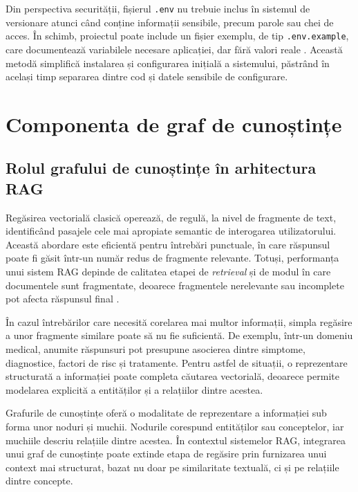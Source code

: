 \documentclass[12pt, a4paper, oneside, romanian]{teza-upb}
\begin{document}
Din perspectiva securității, fișierul \texttt{.env} nu trebuie inclus în sistemul de versionare atunci când conține informații sensibile, precum parole sau chei de acces. În schimb, proiectul poate include un fișier exemplu, de tip \texttt{.env.example}, care documentează variabilele necesare aplicației, dar fără valori reale \cite{python_dotenv_doc}. Această metodă simplifică instalarea și configurarea inițială a sistemului, păstrând în același timp separarea dintre cod și datele sensibile de configurare.

\section{Componenta de graf de cunoștințe}

\subsection{Rolul grafului de cunoștințe în arhitectura RAG}

Regăsirea vectorială clasică operează, de regulă, la nivel de fragmente de text, identificând pasajele cele mai apropiate semantic de interogarea utilizatorului. Această abordare este eficientă pentru întrebări punctuale, în care răspunsul poate fi găsit într-un număr redus de fragmente relevante. Totuși, performanța unui sistem RAG depinde de calitatea etapei de \textit{retrieval} și de modul în care documentele sunt fragmentate, deoarece fragmentele nerelevante sau incomplete pot afecta răspunsul final \cite{gao2023retrieval}.

În cazul întrebărilor care necesită corelarea mai multor informații, simpla regăsire a unor fragmente similare poate să nu fie suficientă. De exemplu, într-un domeniu medical, anumite răspunsuri pot presupune asocierea dintre simptome, diagnostice, factori de risc și tratamente. Pentru astfel de situații, o reprezentare structurată a informației poate completa căutarea vectorială, deoarece permite modelarea explicită a entităților și a relațiilor dintre acestea.

Grafurile de cunoștințe oferă o modalitate de reprezentare a informației sub forma unor noduri și muchii. Nodurile corespund entităților sau conceptelor, iar muchiile descriu relațiile dintre acestea. În contextul sistemelor RAG, integrarea unui graf de cunoștințe poate extinde etapa de regăsire prin furnizarea unui context mai structurat, bazat nu doar pe similaritate textuală, ci și pe relațiile dintre concepte.
\end{document}
